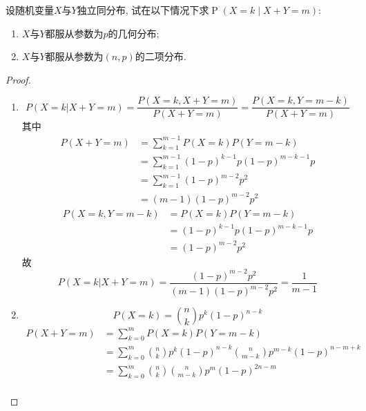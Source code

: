 \documentclass[../main.tex]{subfiles}
\begin{document}
\begin{exercise}{}{}
设随机变量\(X\)与\(Y\)独立同分布, 试在以下情况下求\(\operatorname{P}(X=k\mid X+Y=m)\):

\begin{enumerate}
  \item \(X\)与\(Y\)都服从参数为\(p\)的几何分布;
  \item \(X\)与\(Y\)都服从参数为\((n,p)\)的二项分布.
\end{enumerate}
\end{exercise}
\begin{proof}
  \begin{enumerate}
    \item \[
    P\left( X= k| X+ Y= m \right)= \frac{P\left( X= k, X+ Y= m \right)  }{P\left( X+ Y= m \right)  }= \frac{P\left( X= k,Y= m-k \right)  }{P\left( X+ Y= m \right)  }   
    \]其中\[
   \begin{aligned}
    P\left( X+ Y= m \right)&= \sum _{k= 1}^{m-1} P\left( X= k \right)P\left( Y= m-k \right)   \\ 
     &= \sum _{k= 1}^{m-1} \left( 1-p \right)^{k-1}p \left( 1-p \right)^{m-k-1}p\\ 
      &= \sum _{k= 1}^{m-1}\left( 1-p \right)^{m-2}p^{2}\\ 
       &= \left( m-1 \right)\left( 1-p \right)^{m-2}p^{2}     
   \end{aligned}
    \] \[
  \begin{aligned}
    P\left( X= k,Y= m-k \right)&= P\left( X= k \right)P\left( Y= m-k \right)    \\ 
     &= \left( 1-p \right)^{k-1}p \left( 1-p \right)^{m-k-1}p\\ 
      &= \left( 1-p \right)^{m-2}p^{2}   
  \end{aligned}
    \]故 \[
    P\left( X= k|X+ Y= m \right)= \frac{ \left( 1-p \right)^{m-2}p^{2} }{ \left( m-1 \right)\left( 1-p \right)^{m-2}p^{2}  }= \frac{1 }{m-1 }  
    \]
    \item  \[
    P\left( X= k \right)= \binom{ n }{ k }p^{k}\left( 1-p \right)^{n-k}   
    \] \[
   \begin{aligned}
    P\left( X+ Y= m \right)&= \sum _{k= 0}^{m}P\left( X= k \right)P\left( Y= m-k \right)   \\ 
     &= \sum _{k= 0}^{m}\binom{ n }{ k }p^{k}\left( 1-p \right)^{n-k}\binom{ n }{m-k  }p^{m-k}\left( 1-p \right)^{n-m+ k}\\ 
      &= \sum _{k= 0}^{m}\binom{ n }{ k }\binom{ n }{m-k  }p^{m}\left( 1-p \right)^{2n-m}       \\ 

\end{aligned}\]
\end{enumerate}
\end{proof}
\end{document}
